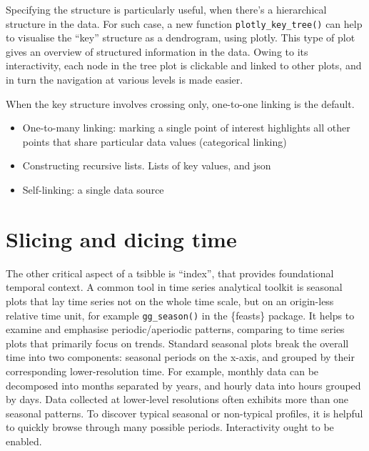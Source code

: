 Specifying the structure is particularly useful, when there's a
hierarchical structure in the data. For such case, a new function
\texttt{plotly\_key\_tree()} can help to visualise the ``key'' structure
as a dendrogram, using plotly. This type of plot gives an overview of
structured information in the data. Owing to its interactivity, each
node in the tree plot is clickable and linked to other plots, and in
turn the navigation at various levels is made easier.

When the key structure involves crossing only, one-to-one linking is the
default.

\begin{itemize}
\tightlist
\item
  One-to-many linking: marking a single point of interest highlights all
  other points that share particular data values (categorical linking)
\item
  Constructing recursive lists. Lists of key values, and json
\item
  Self-linking: a single data source
\end{itemize}

\hypertarget{slicing-and-dicing-time}{%
\section{Slicing and dicing time}\label{slicing-and-dicing-time}}

The other critical aspect of a tsibble is ``index'', that provides
foundational temporal context. A common tool in time series analytical
toolkit is seasonal plots that lay time series not on the whole time
scale, but on an origin-less relative time unit, for example
\texttt{gg\_season()} in the \{feasts\} package. It helps to examine and
emphasise periodic/aperiodic patterns, comparing to time series plots
that primarily focus on trends. Standard seasonal plots break the
overall time into two components: seasonal periods on the x-axis, and
grouped by their corresponding lower-resolution time. For example,
monthly data can be decomposed into months separated by years, and
hourly data into hours grouped by days. Data collected at lower-level
resolutions often exhibits more than one seasonal patterns. To discover
typical seasonal or non-typical profiles, it is helpful to quickly
browse through many possible periods. Interactivity ought to be enabled.

